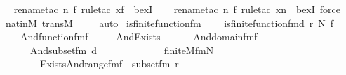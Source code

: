 \begin{isabellebody}
\ \ \isamarkupfalse%
{\isacharparenleft}{\kern0pt}rename{\isacharunderscore}{\kern0pt}tac\ n\ f{\isacharcomma}{\kern0pt}\ rule{\isacharunderscore}{\kern0pt}tac\ x{\isacharequal}{\kern0pt}f\ \ bexI{\isacharparenright}{\kern0pt}\isanewline
\ \ \ \isamarkupfalse%
{\isacharparenleft}{\kern0pt}rename{\isacharunderscore}{\kern0pt}tac\ n\ f{\isacharcomma}{\kern0pt}\ rule{\isacharunderscore}{\kern0pt}tac\ x{\isacharequal}{\kern0pt}n\ \ bexI{\isacharcomma}{\kern0pt}\ force{\isacharparenright}{\kern0pt}\isanewline
\ \ \isamarkupfalse%
\ nat{\isacharunderscore}{\kern0pt}in{\isacharunderscore}{\kern0pt}M\ transM\ \isanewline
\ \ \isamarkupfalse%
\ auto%
\endisatagproof
{\isafoldproof}%
%
\isadelimproof
\isanewline
%
\endisadelimproof
\isanewline
{}\isamarkupfalse%
\ is{\isacharunderscore}{\kern0pt}finite{\isacharunderscore}{\kern0pt}function{\isacharunderscore}{\kern0pt}fm\ \ \isanewline
\ \ {\isachardoublequoteopen}is{\isacharunderscore}{\kern0pt}finite{\isacharunderscore}{\kern0pt}function{\isacharunderscore}{\kern0pt}fm{\isacharparenleft}{\kern0pt}d{\isacharcomma}{\kern0pt}\ r{\isacharcomma}{\kern0pt}\ N{\isacharcomma}{\kern0pt}\ f{\isacharparenright}{\kern0pt}\ {\isasymequiv}\ \isanewline
\ \ \ \ And{\isacharparenleft}{\kern0pt}function{\isacharunderscore}{\kern0pt}fm{\isacharparenleft}{\kern0pt}f{\isacharparenright}{\kern0pt}{\isacharcomma}{\kern0pt}\ \isanewline
\ \ \ \ And{\isacharparenleft}{\kern0pt}Exists{\isacharparenleft}{\kern0pt}\isanewline
\ \ \ \ \ \ And{\isacharparenleft}{\kern0pt}domain{\isacharunderscore}{\kern0pt}fm{\isacharparenleft}{\kern0pt}f{\isacharhash}{\kern0pt}{\isacharplus}{\kern0pt}{}{\isacharcomma}{\kern0pt}\ {}{\isacharparenright}{\kern0pt}{\isacharcomma}{\kern0pt}\ \isanewline
\ \ \ \ \ \ And{\isacharparenleft}{\kern0pt}subset{\isacharunderscore}{\kern0pt}fm{\isacharparenleft}{\kern0pt}{}{\isacharcomma}{\kern0pt}\ d\ {\isacharhash}{\kern0pt}{\isacharplus}{\kern0pt}\ {}{\isacharparenright}{\kern0pt}{\isacharcomma}{\kern0pt}\ \isanewline
\ \ \ \ \ \ \ \ \ \ finite{\isacharunderscore}{\kern0pt}M{\isacharunderscore}{\kern0pt}fm{\isacharparenleft}{\kern0pt}N\ {\isacharhash}{\kern0pt}{\isacharplus}{\kern0pt}\ {}{\isacharcomma}{\kern0pt}\ {}{\isacharparenright}{\kern0pt}{\isacharparenright}{\kern0pt}{\isacharparenright}{\kern0pt}{\isacharparenright}{\kern0pt}{\isacharcomma}{\kern0pt}\ \isanewline
\ \ \ \ \ \ \ \ Exists{\isacharparenleft}{\kern0pt}And{\isacharparenleft}{\kern0pt}range{\isacharunderscore}{\kern0pt}fm{\isacharparenleft}{\kern0pt}f{\isacharhash}{\kern0pt}{\isacharplus}{\kern0pt}{}{\isacharcomma}{\kern0pt}\ {}{\isacharparenright}{\kern0pt}{\isacharcomma}{\kern0pt}\ subset{\isacharunderscore}{\kern0pt}fm{\isacharparenleft}{\kern0pt}{}{\isacharcomma}{\kern0pt}\ r{\isacharhash}{\kern0pt}{\isacharplus}{\kern0pt}{}{\isacharparenright}{\kern0pt}{\isacharparenright}{\kern0pt}{\isacharparenright}{\kern0pt}{\isacharparenright}{\kern0pt}{\isacharparenright}{\kern0pt}{\isachardoublequoteclose}\ \isanewline

\end{isabellebody}
